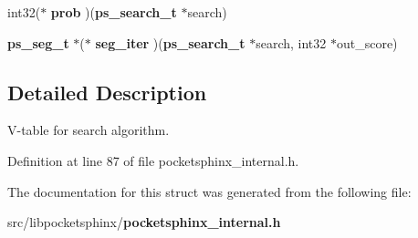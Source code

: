 \begin{DoxyCompactItemize}
\item 
int32($\ast$ {\bfseries prob} )({\bf ps\-\_\-search\-\_\-t} $\ast$search)\label{structps__searchfuncs__s_abf94b8e4523c3f3c39fde4454f78fe16}

\item 
{\bf ps\-\_\-seg\-\_\-t} $\ast$($\ast$ {\bfseries seg\-\_\-iter} )({\bf ps\-\_\-search\-\_\-t} $\ast$search, int32 $\ast$out\-\_\-score)\label{structps__searchfuncs__s_a6b27a306eac9b96f05413aa8d6b9da61}

\end{DoxyCompactItemize}


\subsection{Detailed Description}
V-\/table for search algorithm. 

Definition at line 87 of file pocketsphinx\-\_\-internal.\-h.



The documentation for this struct was generated from the following file\-:\begin{DoxyCompactItemize}
\item 
src/libpocketsphinx/{\bf pocketsphinx\-\_\-internal.\-h}\end{DoxyCompactItemize}
